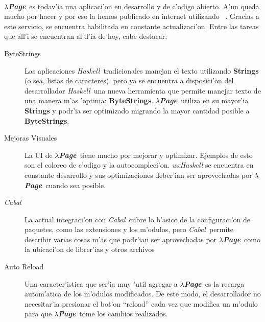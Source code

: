\documentclass[a4paper]{article}
\newcommand{\haskell}{\textsl{Haskell}}
\newcommand{\hpage}{\textbf{\textsl{$\lambda$Page}}}
\newcommand{\cabal}{\textsl{Cabal}}
\begin{document}
\paragraph{}\hpage\ es todav'ia una aplicaci'on en desarrollo y de c'odigo abierto.  A'un queda mucho por hacer y por eso la hemos publicado en internet utilizando ~\cite{github}.  Gracias a este servicio, se encuentra habilitada  en constante actualizaci'on.  Entre las tareas que all'i se encuentran al d'ia de hoy, cabe destacar:
\begin{description}
	\item[ByteStrings] Las aplicaciones \haskell\ tradicionales manejan el texto utilizando \textbf{Strings} (o sea, listas de caracteres), pero ya se encuentra a disposici'on del desarrollador \haskell\ una nueva herramienta que permite manejar texto de una manera m'as 'optima: \textbf{ByteStrings}.  \hpage\ utiliza en su mayor'ia \textbf{Strings} y podr'ia ser optimizado migrando la mayor cantidad posible a \textbf{ByteStrings}.
	\item[Mejoras Visuales] La UI de \hpage\ tiene mucho por mejorar y optimizar.  Ejemplos de esto son el coloreo de c'odigo y la autocompleci'on.  \textsl{wxHaskell} se encuentra en constante desarrollo y sus optimizaciones deber'ian ser aprovechadas por \hpage\ cuando sea posible.
	\item[\cabal] La actual integraci'on con \cabal\ cubre lo b'asico de la configuraci'on de paquetes, como las extensiones y los m'odulos, pero \cabal\ permite describir varias cosas m'as que podr'ian ser aprovechadas por \hpage\ como la ubicaci'on de librer'ias y otros archivos
	\item[Auto Reload] Una caracter'istica que ser'ia muy 'util agregar a \hpage\ es la recarga autom'atica de los m'odulos modificados.  De este modo, el desarrollador no necesitar'ia presionar el bot'on ``reload'' cada vez que modifica un m'odulo para que \hpage\ tome los cambios realizados.
\end{description}
\end{document}
